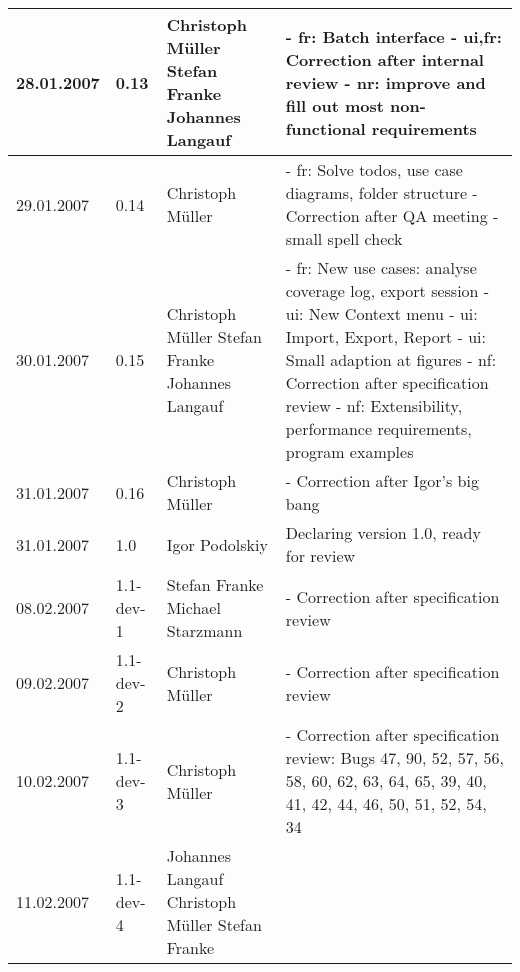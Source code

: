 {\begin{longtable}{|l|l|p{35mm}|p{71mm}|}
    28.01.2007 & 0.13 & Christoph Müller \newline Stefan Franke \newline Johannes Langauf & 
      - fr: Batch interface \newline
      - ui,fr: Correction after internal review \newline
      - nr: improve and fill out most non-functional requirements \\\hline
    29.01.2007 & 0.14 & Christoph Müller & 
      - fr: Solve todos, use case diagrams, folder structure \newline
      - Correction after QA meeting \newline
      - small spell check \\\hline
    30.01.2007 & 0.15 & Christoph Müller \newline Stefan Franke \newline Johannes Langauf & 
      - fr: New use cases: analyse coverage log, export session \newline
      - ui: New Context menu \newline
      - ui: Import, Export, Report \newline
      - ui: Small adaption at figures \newline
      - nf: Correction after specification review \newline
      - nf: Extensibility, performance requirements, program examples \\\hline
    31.01.2007 & 0.16 & Christoph Müller \newline & 
      - Correction after Igor's big bang \\\hline
    31.01.2007 & 1.0 & Igor Podolskiy & Declaring version 1.0, ready for review \\\hline
    08.02.2007 & 1.1-dev-1 & Stefan Franke \newline Michael Starzmann & 
      - Correction after specification review \\\hline
    09.02.2007 & 1.1-dev-2 & Christoph Müller & 
      - Correction after specification review \\\hline
    10.02.2007 & 1.1-dev-3 & Christoph Müller & 
      - Correction after specification review: Bugs 47, 90, 52, 57, 56, 58, 60, 62, 63, 64, 65, 39, 40, 41, 42, 44, 46, 50, 51, 52, 54, 34 \\\hline
    11.02.2007 & 1.1-dev-4 & Johannes Langauf \newline Christoph Müller \newline Stefan Franke & 

\end{longtable}}
